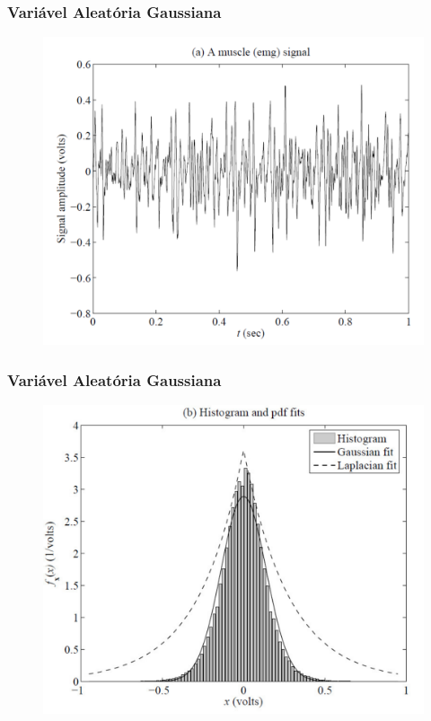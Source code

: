 \begin{frame}
    \frametitle{Variável Aleatória Gaussiana}

    \begin{figure}[t]
	  \begin{center}
	    \includegraphics[width=0.77\columnwidth]{figs/fig14}
	  \end{center}
	\end{figure}
\end{frame}

\begin{frame}
    \frametitle{Variável Aleatória Gaussiana}

    \begin{figure}[t]
	  \begin{center}
	    \includegraphics[width=0.77\columnwidth]{figs/fig15}
	  \end{center}
	\end{figure}
\end{frame}

